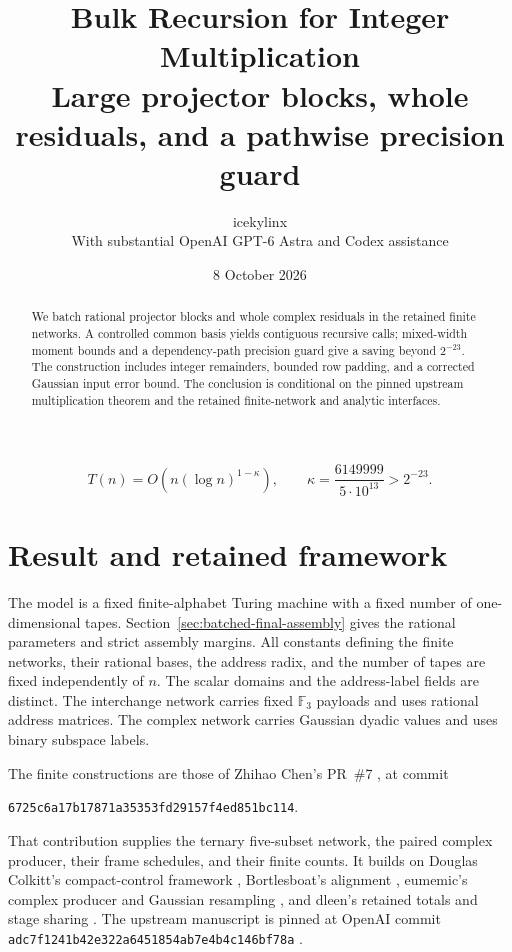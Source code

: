 \documentclass[11pt]{article}
\title{Bulk Recursion for Integer Multiplication\\[4pt]
  \large Large projector blocks, whole residuals, and a pathwise precision guard}
\author{icekylinx\\\small With substantial OpenAI GPT-6 Astra and Codex assistance}
\date{8 October 2026}
\numberwithin{equation}{section}
\begin{document}
\maketitle
\begin{abstract}
We batch rational projector blocks and whole complex residuals in the
retained finite networks. A controlled common basis yields contiguous
recursive calls; mixed-width moment bounds and a dependency-path precision
guard give a saving beyond $2^{-23}$. The construction includes integer
remainders, bounded row padding, and a corrected Gaussian input error
bound. The conclusion is conditional on the pinned upstream multiplication
theorem and the retained finite-network and analytic interfaces.
\end{abstract}
\vspace{1.5em}
\[
\boxed{T(n)=O\!\left(n(\log n)^{1-\kappa}\right),\qquad
\kappa=\frac{6149999}{5\cdot10^{13}}>2^{-23}.}
\]
\clearpage
\tableofcontents
\clearpage

\section{Result and retained framework}
The model is a fixed finite-alphabet Turing machine with a fixed number
of one-dimensional tapes. Section~\ref{sec:batched-final-assembly} gives
the rational parameters and strict assembly margins.
All constants defining the finite networks, their rational bases,
the address radix, and the number of tapes are fixed independently
of $n$. The scalar domains and the address-label fields are distinct.
The interchange network carries fixed $\mathbb F_3$ payloads and uses
rational address matrices. The complex network carries Gaussian dyadic
values and uses binary subspace labels.

The finite constructions are those of Zhihao Chen's PR~\#7
\cite{pr7}, at commit
\begin{center}
\texttt{6725c6a17b17871a35353fd29157f4ed851bc114}.
\end{center}
That contribution supplies the ternary five-subset network, the paired
complex producer, their frame schedules, and their finite counts.
It builds on Douglas Colkitt's compact-control framework
\cite{main}, Bortlesboat's alignment \cite{pr2}, eumemic's complex
producer and Gaussian resampling \cite{pr3,pr5,pr6}, and dleen's
retained totals and stage sharing \cite{pr4}. The upstream manuscript
is pinned at OpenAI commit
\texttt{adc7f1241b42e322a6451854ab7e4b4c146bf78a}
\cite{upstream}.
\end{document}
